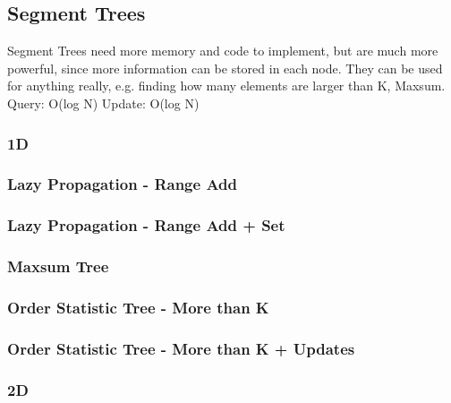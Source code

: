 \documentclass{article}
\begin{document}
\subsection{Segment Trees}
\begin{flushleft}
Segment Trees need more memory and code to implement, but are much more powerful,
since more information can be stored in each node. 
They can be used for anything really, e.g. finding how many elements are larger than K, Maxsum.
\newline
Query: O(log N)
\newline
Update: O(log N)
\end{flushleft}

\subsubsection{1D}

\subsubsection{Lazy Propagation - Range Add}

\subsubsection{Lazy Propagation - Range Add + Set}

\subsubsection{Maxsum Tree}

\subsubsection{Order Statistic Tree - More than K}

\subsubsection{Order Statistic Tree - More than K + Updates}

\subsubsection{2D}

\end{document}
